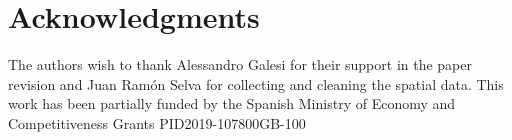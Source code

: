 \documentclass[Royal,times,sageh]{sagej}
\begin{document}
\hypertarget{acknowledgments}{%
\section{Acknowledgments}\label{acknowledgments}}

The authors wish to thank Alessandro Galesi for their support in the
paper revision and Juan Ramón Selva for collecting and cleaning the
spatial data. This work has been partially funded by the Spanish
Ministry of Economy and Competitiveness Grants PID2019-107800GB-100



\end{document}
